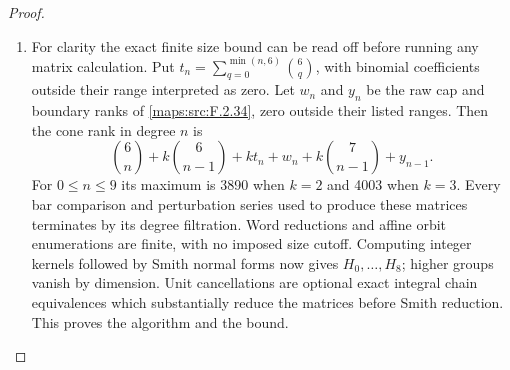 \documentclass[11pt,a4paper]{article}
\theoremstyle{definition}
\begin{document}
\begin{proof}
\begin{enumerate}[label=\arabic*.]
\item For clarity the exact finite size bound can be read off
before running any matrix calculation.  Put
$t_n=\sum_{q=0}^{\min(n,6)}\binom6q$, with binomial
coefficients outside their range interpreted as zero.
Let $w_n$ and $y_n$ be the raw cap and boundary ranks of
\ref{maps:src:F.2.34}, zero outside their listed ranges.  Then the cone rank
in degree $n$ is
\[
 \binom6n+k\binom6{n-1}+k t_n+w_n+
 k\binom7{n-1}+y_{n-1}.                                 \tag{F.GC9}\label{maps:eq:F.GC9}
\]
For $0\leq n\leq9$ its maximum is 3890 when $k=2$ and
4003 when $k=3$.  Every bar comparison and perturbation
series used to produce these matrices terminates by its
degree filtration.  Word reductions and affine orbit
enumerations are finite, with no imposed size cutoff.
Computing integer kernels followed by Smith normal forms
now gives $H_0,\ldots,H_8$; higher groups vanish by dimension.
Unit cancellations are optional exact integral chain
equivalences which substantially reduce the matrices before
Smith reduction.  This proves the algorithm and the bound.
\end{enumerate}
\end{proof}
\end{document}
